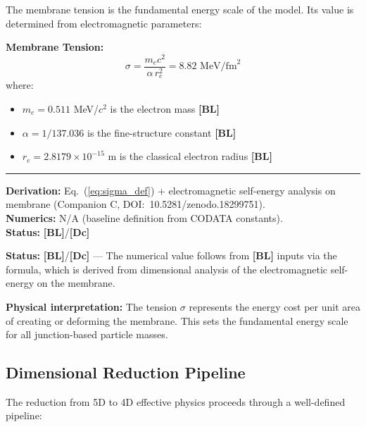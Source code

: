 \documentclass[11pt,a4paper]{article}
\newcommand{\tagDc}{\textcolor{blue!70!black}{\textbf{[Dc]}}}
\newcommand{\tagBL}{\textcolor{gray!70!black}{\textbf{[BL]}}}
\begin{document}
The membrane tension is the fundamental energy scale of the model. Its value is determined from electromagnetic parameters:

\begin{resultbox}
\textbf{Membrane Tension:}
\begin{equation}
    \sigma = \frac{m_e c^2}{\alpha \, r_e^2} = 8.82 \text{ MeV/fm}^2
    \label{eq:sigma_def}
\end{equation}
where:
\begin{itemize}[nosep]
    \item $m_e = 0.511$ MeV/$c^2$ is the electron mass \tagBL{}
    \item $\alpha = 1/137.036$ is the fine-structure constant \tagBL{}
    \item $r_e = 2.8179 \times 10^{-15}$ m is the classical electron radius \tagBL{}
\end{itemize}

\vspace{0.3em}\hrule\vspace{0.3em}
\textbf{Derivation:} Eq.~(\ref{eq:sigma_def}) + electromagnetic self-energy analysis on membrane (Companion C, DOI:~10.5281/zenodo.18299751).\\
\textbf{Numerics:} N/A (baseline definition from CODATA constants).\\
\textbf{Status:} \tagBL{}/\tagDc{}
\end{resultbox}

\textbf{Status:} \tagBL{}/\tagDc{} --- The numerical value follows from \tagBL{} inputs via the formula, which is derived from dimensional analysis of the electromagnetic self-energy on the membrane.

\textbf{Physical interpretation:} The tension $\sigma$ represents the energy cost per unit area of creating or deforming the membrane. This sets the fundamental energy scale for all junction-based particle masses.

\subsection{Dimensional Reduction Pipeline}

The reduction from 5D to 4D effective physics proceeds through a well-defined pipeline:

\begin{center}
\end{center}
\end{document}
